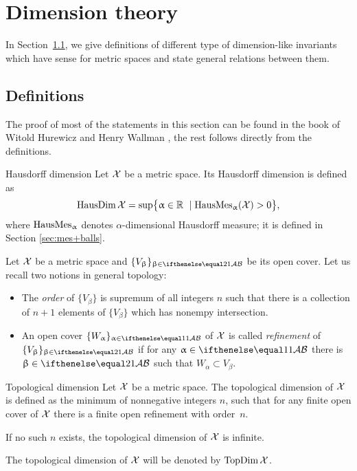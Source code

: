 \chapter{Dimension theory}

In Section~\ref{sec:prelim:dim}, we give definitions of different type of dimension-like invariants which have sense for metric spaces and state general relations between them.


\section{Definitions}\label{sec:prelim:dim}

The proof of most of the statements in this section can be found in the book of Witold Hurewicz and Henry Wallman \cite{top-dim}, 
the rest follows directly from the definitions.

\begin{thm}{Hausdorff dimension}
\label{def:HausDim}
Let $\mathcal{X}$ be a metric space. 
Its Hausdorff dimension is defined as
\[\HausDim\spc{X}=\sup\bigl\{\alpha\in\RR\ \mid \HausMes_\alpha(\spc{X})>0\bigr\},\]
 where $\mathop{\rm HausMes}\nolimits_\upalpha$ denotes $\alpha$-dimensional Hausdorff measure;
it is defined in Section \ref{sec:mes+balls}.
\end{thm}

Let $\mathcal{X}$ be a metric space and $\{V_\beta\}_{\beta\in\IndexSet[2]}$
 be its open cover.
Let us recall two notions in general topology:
\begin{itemize}
\item The \emph{order} of $\{V_\beta\}$ is supremum of all integers $n$ such that there is a collection of $n+1$ elements of $\{V_\beta\}$ which has nonempy intersection.
\item An open cover $\{W_\alpha\}_{\alpha\in\IndexSet}$ of $\mathcal{X}$ is called \emph{refinement} of  $\{V_\beta\}_{\beta\in\IndexSet[2]}$ if for any $\alpha\in\IndexSet$ there is $\beta\in\IndexSet[2]$ such that $W_\alpha\subset V_\beta$.
\end{itemize}

\begin{thm}{Topological dimension}
\label{def:TopDim}
Let $\mathcal{X}$ be a metric space. 
The topological dimension of $\mathcal{X}$ is defined as the minimum of nonnegative integers $n$, 
such that for any finite open cover of $\mathcal{X}$ there is a finite open refinement with order~$n$.

If no such $n$ exists, the topological dimension of $\mathcal{X}$ is infinite.

The topological dimension of $\mathcal{X}$ will be denoted by $\mathop{\rm TopDim}\nolimits\mathcal{X}$.
\end{thm}

